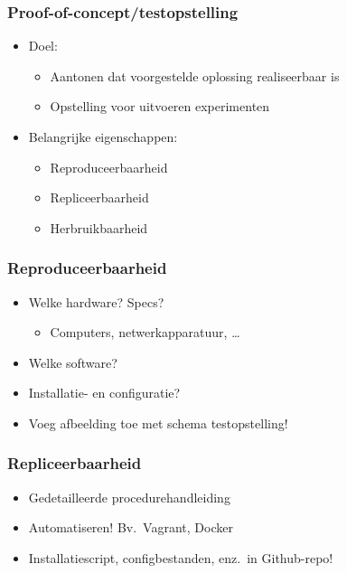 \documentclass[aspectratio=169]{beamer}
\begin{document}
\begin{frame}
  \frametitle{Proof-of-concept/testopstelling}

  \begin{itemize}
    \item Doel:
      \begin{itemize}
        \item Aantonen dat voorgestelde oplossing realiseerbaar is
        \item Opstelling voor uitvoeren experimenten
      \end{itemize}
    \item Belangrijke eigenschappen:
      \begin{itemize}
        \item Reproduceerbaarheid
        \item Repliceerbaarheid
        \item Herbruikbaarheid
      \end{itemize} 
  \end{itemize}

\end{frame}

\begin{frame}
  \frametitle{Reproduceerbaarheid}


  \bigskip

  \begin{itemize}
    \item Welke hardware? Specs?
      \begin{itemize}
        \item Computers, netwerkapparatuur, \ldots
      \end{itemize}
    \item Welke software?
    \item Installatie- en configuratie?
    \item Voeg afbeelding toe met schema testopstelling!
  \end{itemize}

\end{frame}

\begin{frame}
  \frametitle{Repliceerbaarheid}


  \bigskip

  \begin{itemize}
    \item Gedetailleerde procedurehandleiding
    \item Automatiseren! Bv.\ Vagrant, Docker
    \item Installatiescript, configbestanden, enz.\ in Github-repo!
  \end{itemize}

\end{frame}
\end{document}
